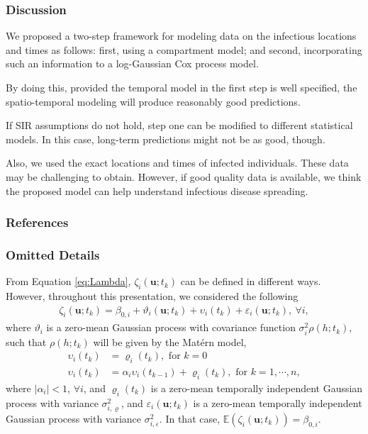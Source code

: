 \documentclass[12pt, aspectratio = 169]{beamer} %
\begin{document}
	\begin{frame}[t]
		\frametitle{Discussion}
		\justifying
		
		We proposed a two-step framework for modeling data on the infectious locations and times as follows: first, using a compartment model;  and second, incorporating such an information to a  log-Gaussian Cox process model.
		
		\pause
		
		By doing this, provided the temporal model in the first step is well specified,	the spatio-temporal modeling will produce reasonably good predictions. 
		
		\pause
		
		If SIR assumptions do not hold, step one can be modified to different statistical models. In this case, long-term predictions might not be as good, though.
		
		\pause
		
		Also, we used the exact locations and times of infected individuals. These data may be challenging to obtain. However, if good quality data is available, we think the proposed model can help understand infectious disease spreading.
	
	\end{frame}
		
	\begin{frame}[t] %
		\frametitle{References}
		\justifying
		\footnotesize
		
		
	\end{frame}

	\begin{frame}[t]
			\frametitle{Omitted Details}
			\justifying
			
			From Equation \eqref{eq:Lambda}, $\zeta_i(\mathbf{u}; t_k)$ can be defined in different ways. However, throughout this presentation, we considered the following
			\begin{align} \label{eq:zeta}
					\zeta_i(\mathbf{u}; t_k) = \beta_{0, i} + \vartheta_i(\mathbf{u}; t_k) + \upsilon_i(t_k) + \varepsilon_i(\mathbf{u}; t_k), ~\forall i,
				\end{align}
			where $\vartheta_i$ is a zero-mean Gaussian process with covariance function $\sigma_i^2 \rho(h; t_k)$, such that $\rho(h; t_k)$ will be given by the Matérn model, 
			\begin{align*}
					\upsilon_i(t_k) &= \varrho_i(t_k),  \text{ for } k = 0 \\
					\upsilon_i(t_k) &= \alpha_i \upsilon_i(t_{k-1}) + \varrho_i(t_k), \text{ for } k = 1, \cdots, n,
				\end{align*}
			where $|\alpha_i| < 1$, $\forall i$, and $\varrho_i(t_k)$ is a zero-mean temporally independent Gaussian process with variance $\sigma_{i, \varrho}^2$, and $\varepsilon_i(\mathbf{u}; t_k)$ is a zero-mean temporally independent Gaussian process with variance $\sigma^{2}_{i, \varepsilon}$.  In that case, $\mathbb{E}(\zeta_i(\mathbf{u}; t_k)) = \beta_{0, i}$.
		\end{frame}
	
\end{document}
